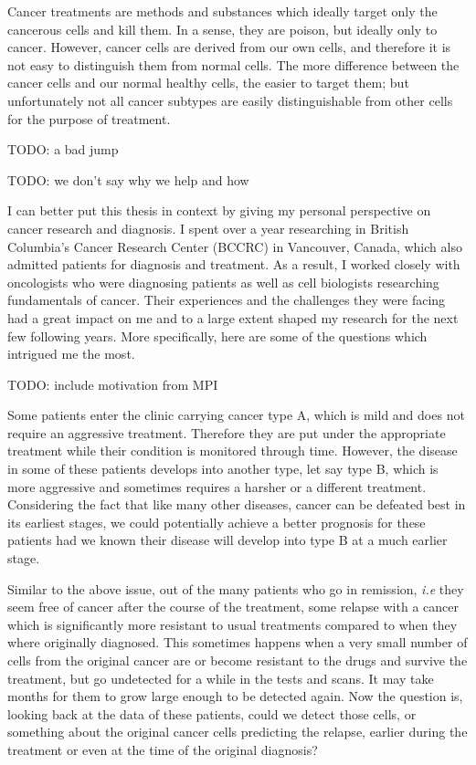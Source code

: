 Cancer treatments are methods and substances which ideally target only the
cancerous cells and kill them. In a sense, they are poison, but ideally only to
cancer. However, cancer cells are derived from our own cells, and therefore it
is not easy to distinguish them from normal cells. The more difference between
the cancer cells and our normal healthy cells, the easier to target them; but
unfortunately not all cancer subtypes are easily distinguishable from other
cells for the purpose of treatment.

TODO: a bad jump

TODO: we don't say why we help and how

I can better put this thesis in context by giving my personal perspective on
cancer research and diagnosis. I spent over a year researching in British
Columbia's Cancer Research Center (BCCRC) in Vancouver, Canada, which also
admitted patients for diagnosis and treatment. As a result, I worked closely
with oncologists who were diagnosing patients as well as cell biologists
researching fundamentals of cancer. Their experiences and the challenges they
were facing had a great impact on me and to a large extent shaped my research
for the next few following years. More specifically, here are some of the
questions which intrigued me the most.

TODO: include motivation from MPI

Some patients enter the clinic carrying cancer type A, which is mild and does
not require an aggressive treatment. Therefore they are put under the
appropriate treatment while their condition is monitored through time. However,
the disease in some of these patients develops into another type, let say type
B, which is more aggressive and sometimes requires a harsher or a different
treatment. Considering the fact that like many other diseases, cancer can be
defeated best in its earliest stages, we could potentially achieve a better
prognosis for these patients had we known their disease will develop into type
B at a much earlier stage.

Similar to the above issue, out of the many patients who go in remission,
\emph{i.e} they seem free of cancer after the course of the treatment, some
relapse with a cancer which is significantly more resistant to usual treatments
compared to when they where originally diagnosed. This sometimes happens when a
very small number of cells from the original cancer are or become resistant to
the drugs and survive the treatment, but go undetected for a while in the tests
and scans. It may take months for them to grow large enough to be detected
again. Now the question is, looking back at the data of these patients, could we
detect those cells, or something about the original cancer cells predicting the
relapse, earlier during the treatment or even at the time of the original
diagnosis?

